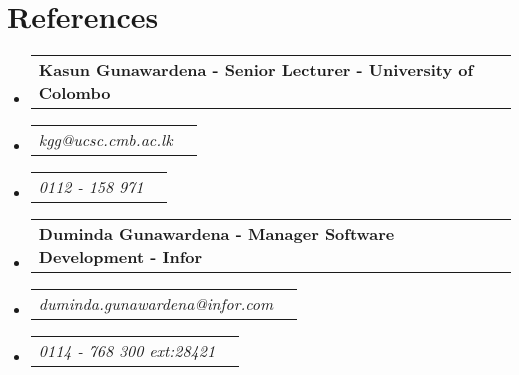 \documentclass[letterpaper,11pt]{article}
\makeatletter
\newcommand{\resumeSubheading}[2]{
  \vspace{-2pt}\item
    \begin{tabular*}{0.97\textwidth}[t]{l@{\extracolsep{\fill}}r}
      \textbf{\small#1} & \textit{\small #2} \\
    \end{tabular*}\vspace{-7pt}
}
\newcommand{\resumeSubSubheading}[2]{
    \item
    \begin{tabular*}{0.97\textwidth}{l@{\extracolsep{\fill}}r}
      \textit{\small#1} & \textit{\small #2} \\
    \end{tabular*}\vspace{-7pt}
}
\newcommand{\resumeSubHeadingListStart}{\begin{itemize}[leftmargin=0.15in, label={}]}
\newcommand{\resumeSubHeadingListEnd}{\end{itemize}}
\makeatother
\begin{document}
\vspace{8pt}
\section{References}
  \vspace{16pt}
  \resumeSubHeadingListStart

    \resumeSubheading
      {Kasun Gunawardena - Senior Lecturer - University of Colombo}{}
      \resumeSubSubheading{kgg@ucsc.cmb.ac.lk}{}
      \resumeSubSubheading{0112 - 158 971}{}
      \vspace{16pt}

    \resumeSubheading
      {Duminda Gunawardena - Manager Software Development - Infor}{}
      \resumeSubSubheading{duminda.gunawardena@infor.com}{}
      \resumeSubSubheading{0114 - 768 300 ext:28421}{}

  \resumeSubHeadingListEnd
\end{document}
